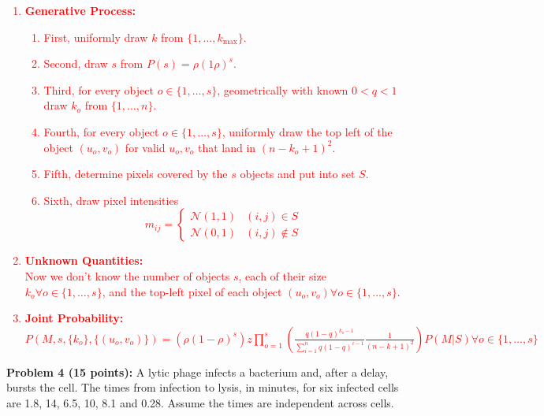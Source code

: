 \documentclass[11pt]{article}
\begin{document}
\textcolor{red}{
\begin{enumerate}
    \item \textbf{Generative Process:}\\
        \begin{enumerate}
            \item 
                First, uniformly draw $k$ from $\{1,\ldots,k_{\max}\}$.
            \item 
                Second, draw $s$ from $P(s)=\rho(1 \rho)^s$.
            \item 
                Third, for every object $o \in \{1,\ldots,s\}$, geometrically with known $0 < q < 1$ draw $k_o$ from $\{1,\ldots,n\}$.
            \item 
                Fourth, for every object $o \in \{1,\ldots,s\}$, uniformly draw the top left of the object $(u_o,v_o)$ for valid $u_o,v_o$ that land in $(n-k_o+1)^2$.
            \item 
                Fifth, determine pixels covered by the $s$ objects and put into set $S$.
            \item 
                Sixth, draw pixel intensities
                \[
                m_{ij} = 
                \begin{cases} 
                      \mathcal N(1,1) & (i,j) \in S \\
                      \mathcal N(0,1) & (i,j) \notin S 
                \end{cases}
                \]
        \end{enumerate}
    \item \textbf{Unknown Quantities:}\\
        Now we don't know the number of objects $s$, each of their size $k_o \forall o \in \{1,\ldots,s\}$, and the top-left pixel of each object $(u_o,v_o) \forall o \in \{1,\ldots,s\}$.
    \item \textbf{Joint Probability:}\\
        $P(M, s, \{k_o\}, \{(u_o, v_o)\}) = (\rho(1-\rho)^s)z \prod_{o=1}^{s} \left(\frac{q(1-q)^{k_o-1}}{\sum_{i=1}^n q(1-q)^{i-1}} \frac{1}{(n-k+1)^2} \right) P(M|S) \forall o \in \{1,\ldots,s\}$
\end{enumerate}
}

{\bf Problem 4 (15 points):} A lytic phage infects a bacterium and, after a delay, bursts the cell.  The times from infection to lysis, in minutes, for six infected cells are 1.8, 14, 6.5, 10, 8.1 and 0.28. Assume the times are independent across cells.
\end{document}
